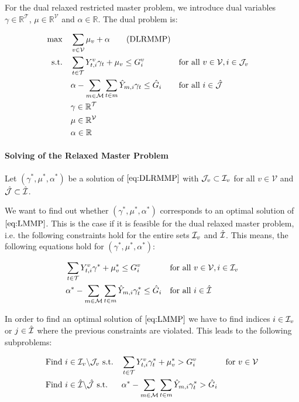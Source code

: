 For the dual relaxed restricted master problem, we introduce dual variables $\gamma\in\mathbb{R}^{\mathcal{T}}$, $\mu\in\mathbb{R}^{\mathcal{V}}$ and $\alpha\in\mathbb{R}$. The dual problem is:

\begin{align*}
	\max \quad & \sum_{v\in\mathcal{V}}\mu_v + \alpha \tag{DLRMMP} \label{eq:DLRMMP} \\
	\text{s.t.} \quad & \sum_{t\in\mathcal{T}} Y^v_{t,i}\gamma_t + \mu_v \leq G^v_i && \text{for all } v\in\mathcal{V},i\in\mathcal{J}_v \\
	& \alpha - \sum_{m\in\mathcal{M}}\sum_{t\in m}\hat{Y}_{m,i}\gamma_t \leq \hat{G}_i && \text{for all } i\in\hat{\mathcal{J}} \\
	& \gamma\in\mathbb{R}^{\mathcal{T}} \\
	& \mu\in\mathbb{R}^{\mathcal{V}} \\
	& \alpha\in\mathbb{R}
\end{align*}

\paragraph{Solving of the Relaxed Master Problem} \parfill

Let $\left(\gamma^*,\mu^*,\alpha^*\right)$ be a solution of $\eqref{eq:DLRMMP}$ with $\mathcal{J}_v\subset\mathcal{I}_v$ for all $v\in\mathcal{V}$ and $\hat{\mathcal{J}}\subset\hat{\mathcal{I}}$. 

We want to find out whether $\left(\gamma^*,\mu^*,\alpha^*\right)$ corresponds to an optimal solution of $\eqref{eq:LMMP}$. This is the case if it is feasible for the dual relaxed master problem, i.e. the following constraints hold for the entire sets $\mathcal{I}_v$ and $\hat{\mathcal{I}}$. This means, the following equations hold for $\left(\gamma^*,\mu^*,\alpha^*\right)$:

\begin{align}
	& \sum_{t\in\mathcal{T}} Y^v_{t,i}\gamma^* + \mu^*_v \leq G^v_i && \text{for all } v\in\mathcal{V},i\in\mathcal{I}_v \label{eq:DLMMP:vehicle} \\
	& \alpha^* - \sum_{m\in\mathcal{M}}\sum_{t\in m}\hat{Y}_{m,i}\gamma^*_t \leq \hat{G}_i && \text{for all } i\in\hat{\mathcal{I}} \label{eq:DLMMP:route}
\end{align}

In order to find an optimal solution of $\eqref{eq:LMMP}$ we have to find indices $i\in\mathcal{I}_v$ or $j\in\hat{\mathcal{I}}$ where the previous constraints are violated. This leads to the following subproblems:

\begin{align*}
	& \text{Find } i\in\mathcal{I}_v\backslash\mathcal{J}_v \text{ s.t.} && \sum_{t\in\mathcal{T}}Y^v_{t,i}\gamma^*_t + \mu^*_v > G^v_i && \text{for } v\in\mathcal{V} \\
	& \text{Find } i\in\hat{\mathcal{I}}\backslash\hat{\mathcal{J}} \text{ s.t.} && \alpha^*-\sum_{m\in\mathcal{M}}\sum_{t\in m}\hat{Y}_{m,i}\gamma^*_t > \hat{G}_i
\end{align*}

